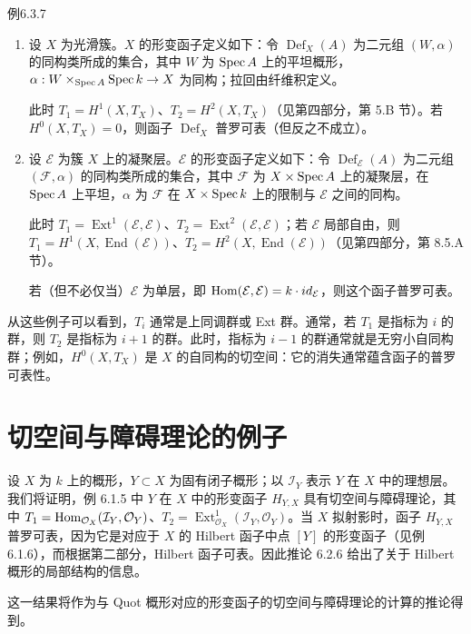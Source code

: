 \begin{origstatement}{例}{6.3.7}\label{ch06:6.3.7}
\begin{enumerate}[label=(\arabic*)]
\item 设 $X$ 为光滑簇。$X$ 的形变函子定义如下：令 $\operatorname{Def}_X(A)$ 为二元组 $(W,\alpha)$ 的同构类所成的集合，其中 $W$ 为 $\operatorname{Spec} A$ 上的平坦概形，$\alpha:W\times_{\operatorname{Spec} A}\operatorname{Spec} k\to X$ 为同构；拉回由纤维积定义。

此时 $T_1=H^1(X,T_X)$、$T_2=H^2(X,T_X)$（见第四部分，第 5.B 节）。若 $H^0(X,T_X)=0$，则函子 $\operatorname{Def}_X$ 普罗可表（但反之不成立）。
\item 设 $\mathcal E$ 为簇 $X$ 上的凝聚层。$\mathcal E$ 的形变函子定义如下：令 $\operatorname{Def}_{\mathcal E}(A)$ 为二元组 $(\mathcal F,\alpha)$ 的同构类所成的集合，其中 $\mathcal F$ 为 $X\times\operatorname{Spec} A$ 上的凝聚层，在 $\operatorname{Spec} A$ 上平坦，$\alpha$ 为 $\mathcal F$ 在 $X\times\operatorname{Spec} k$ 上的限制与 $\mathcal E$ 之间的同构。

此时 $T_1=\operatorname{Ext}^1(\mathcal E,\mathcal E)$、$T_2=\operatorname{Ext}^2(\mathcal E,\mathcal E)$；若 $\mathcal E$ 局部自由，则 $T_1=H^1(X,\operatorname{End}(\mathcal E))$、$T_2=H^2(X,\operatorname{End}(\mathcal E))$（见第四部分，第 8.5.A 节）。

若（但不必仅当）$\mathcal E$ 为单层，即 $\operatorname{Hom}(\mathcal E,\mathcal E)=k\cdot id_{\mathcal E}$，则这个函子普罗可表。
\end{enumerate}
\end{origstatement}
从这些例子可以看到，$T_i$ 通常是上同调群或 Ext 群。通常，若 $T_1$ 是指标为 $i$ 的群，则 $T_2$ 是指标为 $i+1$ 的群。此时，指标为 $i-1$ 的群通常就是无穷小自同构群；例如，$H^0(X,T_X)$ 是 $X$ 的自同构的切空间：它的消失通常蕴含函子的普罗可表性。

\section{切空间与障碍理论的例子}
设 $X$ 为 $k$ 上的概形，$Y\subset X$ 为固有闭子概形；以 $\mathcal I_Y$ 表示 $Y$ 在 $X$ 中的理想层。我们将证明，例 6.1.5 中 $Y$ 在 $X$ 中的形变函子 $H_{Y,X}$ 具有切空间与障碍理论，其中 $T_1=\operatorname{Hom}_{\mathcal O_X}(\mathcal I_Y,\mathcal O_Y)$、$T_2=\operatorname{Ext}^1_{\mathcal O_X}(\mathcal I_Y,\mathcal O_Y)$。当 $X$ 拟射影时，函子 $H_{Y,X}$ 普罗可表，因为它是对应于 $X$ 的 Hilbert 函子中点 $[Y]$ 的形变函子（见例 6.1.6），而根据第二部分，Hilbert 函子可表。因此推论 6.2.6 给出了关于 Hilbert 概形的局部结构的信息。

这一结果将作为与 Quot 概形对应的形变函子的切空间与障碍理论的计算的推论得到。

